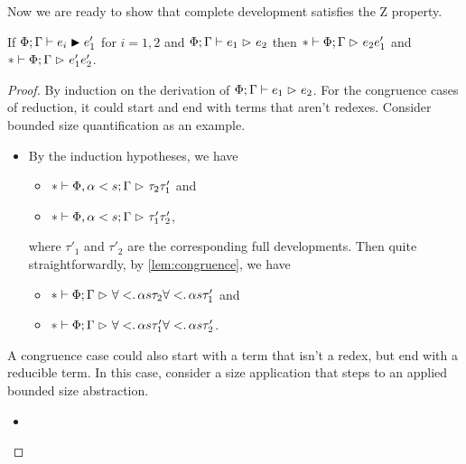 Now we are ready to show that complete development satisfies the Z property.

\begin{lemma} \label{lem:Z-property}
If $\develop{\Phi; \Gamma}{e_i}{e'_1}$ for $i = 1, 2$
and $\red{\Phi; \Gamma}{e_1}{e_2}$
then $\red*{\Phi; \Gamma}{e_2}{e'_1}$
and $\red*{\Phi; \Gamma}{e'_1}{e'_2}$.
\end{lemma}

\begin{proof}
By induction on the derivation of $\red{\Phi; \Gamma}{e_1}{e_2}$.
For the congruence cases of reduction,
it could start and end with terms that aren't redexes.
Consider bounded size quantification as an example.
\begin{itemize}[noitemsep, label=\textbf{Case}, leftmargin=*, labelindent=\parindent]
  \item
  \begin{mathpar}
  \end{mathpar}
  By the induction hypotheses, we have
  \begin{itemize}[noitemsep]
    \item $\red*{\Phi, \bound{\alpha}{s}; \Gamma}{\tau_2}{\tau'_1}$ and
    \item $\red*{\Phi, \bound{\alpha}{s}; \Gamma}{\tau'_1}{\tau'_2}$,
  \end{itemize}
  where $\tau'_1$ and $\tau'_2$ are the corresponding full developments.
  Then quite straightforwardly, by \cref{lem:congruence}, we have
  \begin{itemize}[noitemsep]
    \item $\red*{\Phi; \Gamma}{\Funtype<{\alpha}{s}{\tau_2}}{\Funtype<{\alpha}{s}{\tau'_1}}$ and
    \item $\red*{\Phi; \Gamma}{\Funtype<{\alpha}{s}{\tau'_1}}{\Funtype<{\alpha}{s}{\tau'_2}}$.
  \end{itemize}
\end{itemize}
A congruence case could also start with a term that isn't a redex,
but end with a reducible term.
In this case, consider a size application that steps to an applied bounded size abstraction.
\begin{itemize}[noitemsep, label=\textbf{Case}, leftmargin=*, labelindent=\parindent]
  \item
  \begin{mathpar}
\end{mathpar}
\end{itemize}
\end{proof}
